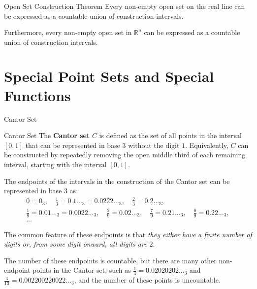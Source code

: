 \begin{theorem}{Open Set Construction Theorem} %
    Every non-empty open set on the real line can be expressed as a countable union of construction intervals.
    
    Furthermore, every non-empty open set in \(\mathbb{R}^n\) can be expressed as a countable union of construction intervals.
\end{theorem}

\section{Special Point Sets and Special Functions} %

\begin{leftbarTitle}{Cantor Set}\end{leftbarTitle} %
\begin{definition}{Cantor Set} %
    The \textbf{Cantor set} \(C\) is defined as the set of all points in the interval \([0, 1]\) 
    that can be represented in base \(3\) without the digit \(1\). 
    Equivalently, \(C\) can be constructed by repeatedly removing the open middle third of each remaining interval, 
    starting with the interval \([0, 1]\).
\end{definition}

The endpoints of the intervals in the construction of the Cantor set can be represented in base \(3\) as:
\begin{gather*}
    0 = 0_3, \quad
    \frac{1}{3} = 0.1\ldots_3 = 0.0222\ldots_3, \quad
    \frac{2}{3} = 0.2\ldots_3, \\
    \frac{1}{9} = 0.01\ldots_3 = 0.0022\ldots_3, \quad
    \frac{2}{9} = 0.02\ldots_3, \quad
    \frac{7}{9} = 0.21\ldots_3, \quad
    \frac{8}{9} = 0.22\ldots_3, \\
    \ldots
\end{gather*}

The common feature of these endpoints is that \emph{they either have a finite number of digits or, 
from some digit onward, all digits are \(2\)}.

The number of these endpoints is countable, but there are many other non-endpoint points in the Cantor set, 
such as \(\frac{1}{4} = 0.02020202\ldots_3\) and \(\frac{4}{13} = 0.002200220022\ldots_3\), 
and the number of these points is uncountable.

